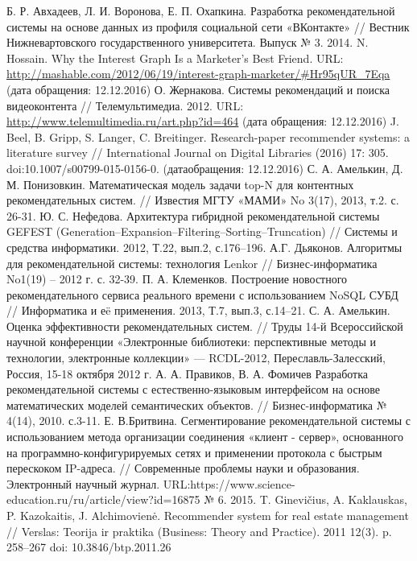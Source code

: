 \documentclass[a4paper,14pt,openany,final]{extreport} %
\begin{document}
{\begin{thebibliography}{99}
 Б. Р. Авхадеев, Л. И. Воронова, Е. П. Охапкина. Разработка рекомендательной системы на основе данных из профиля социальной сети «ВКонтакте» // Вестник Нижневартовского государственного университета. Выпуск № 3. 2014.
 N. Hossain. Why the Interest Graph Is a Marketer’s Best Friend. URL: \url{http://mashable.com/2012/06/19/interest-graph-marketer/#Hr95qUR_7Eqa} (дата обращения: 12.12.2016)
 О. Жернакова. Системы рекомендаций и поиска видеоконтента // Телемультимедиа. 2012. URL: \url{http://www.telemultimedia.ru/art.php?id=464} (дата обращения: 12.12.2016)
 J. Beel, B. Gripp, S. Langer, C. Breitinger. Research-paper recommender systems: a literature survey // International Journal on Digital Libraries (2016) 17: 305. doi:10.1007/s00799-015-0156-0. (датаобращения: 12.12.2016)
 С. А. Амелькин, Д. М. Понизовкин. Математическая модель задачи top-N для контентных рекомендательных систем. // Известия МГТУ «МАМИ» No 3(17), 2013, т.2. с. 26-31.
 Ю. С. Нефедова. Архитектура гибридной рекомендательной системы GEFEST (Generation–Expansion–Filtering–Sorting–Truncation) // Системы и средства информатики. 2012, Т.22, вып.2, с.176–196.
 А.Г. Дьяконов. Алгоритмы для рекомендательной системы: технология Lenkor // Бизнес-информатика No1(19) – 2012 г. с. 32-39.
 П. А. Клеменков. Построение новостного рекомендательного сервиса реального времени с использованием NoSQL СУБД // Информатика и еë применения. 2013, Т.7, вып.3, с.14–21.
 С. А. Амелькин. Оценка эффективности рекомендательных систем. // Труды 14-й Всероссийской научной конференции «Электронные библиотеки: перспективные методы и технологии, электронные коллекции» — RCDL-2012, Переславль-Залесский, Россия, 15-18 октября 2012 г.
 А. А. Правиков, В. А. Фомичев Разработка рекомендательной системы с естественно-языковым интерфейсом на основе математических моделей семантических объектов. // Бизнес-информатика № 4(14), 2010. с.3-11.
 Е. В.Бритвина. Сегментирование рекомендательной системы с использованием метода организации соединения «клиент - сервер», основанного на программно-конфигурируемых сетях и применении протокола с быстрым перескоком IP-адреса. // Современные проблемы науки и образования. Электронный научный журнал. URL:https://www.science-education.ru/ru/article/view?id=16875 № 6. 2015.
 T. Ginevičius, A. Kaklauskas, P. Kazokaitis, J. Alchimovienė. Recommender system for real estate management // Verslas: Teorija ir praktika (Business: Theory and Practice). 2011 12(3). p. 258–267 doi: 10.3846/btp.2011.26

\end{thebibliography}}
\end{document}

